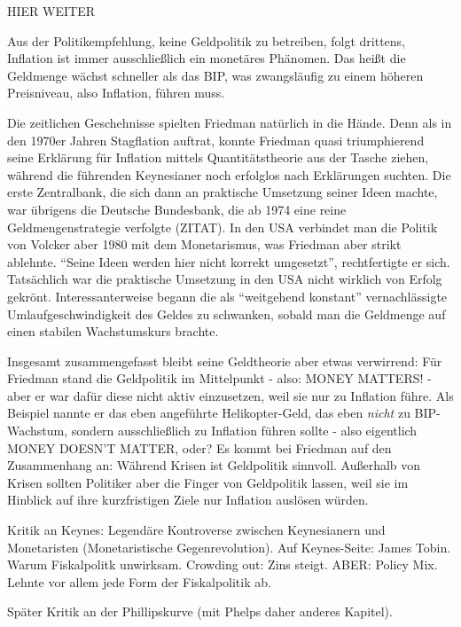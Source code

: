 HIER WEITER

Aus der Politikempfehlung, keine Geldpolitik zu betreiben, folgt drittens, Inflation ist immer ausschließlich ein monetäres Phänomen. Das heißt die Geldmenge wächst schneller als das BIP, was zwangsläufig zu einem höheren Preisniveau, also Inflation, führen muss.

Die zeitlichen Geschehnisse spielten Friedman natürlich in die Hände. Denn als in den 1970er Jahren Stagflation auftrat, konnte Friedman quasi triumphierend seine Erklärung für Inflation mittels Quantitätstheorie aus der Tasche ziehen, während die führenden Keynesianer noch erfolglos nach Erklärungen suchten. Die erste Zentralbank, die sich dann an praktische Umsetzung seiner Ideen machte, war übrigens die Deutsche Bundesbank, die ab 1974 eine reine Geldmengenstrategie verfolgte (ZITAT). In den USA verbindet man die Politik von Volcker aber 1980 mit dem Monetarismus, was Friedman aber strikt ablehnte. "`Seine Ideen werden hier nicht korrekt umgesetzt"', rechtfertigte er sich. Tatsächlich war die praktische Umsetzung in den USA nicht wirklich von Erfolg gekrönt. Interessanterweise begann die als "`weitgehend konstant"' vernachlässigte Umlaufgeschwindigkeit des Geldes zu schwanken, sobald man die Geldmenge auf einen stabilen Wachstumskurs brachte.



Insgesamt zusammengefasst bleibt seine Geldtheorie aber etwas verwirrend: Für Friedman stand die Geldpolitik im Mittelpunkt - also: MONEY MATTERS! - aber er war dafür diese nicht aktiv einzusetzen, weil sie nur zu Inflation führe. Als Beispiel nannte er das eben angeführte Helikopter-Geld, das eben \textit{nicht} zu BIP-Wachstum, sondern ausschließlich zu Inflation führen sollte - also eigentlich MONEY DOESN'T MATTER, oder? Es kommt bei Friedman auf den Zusammenhang an: Während Krisen ist Geldpolitik sinnvoll. Außerhalb von Krisen sollten Politiker aber die Finger von Geldpolitik lassen, weil sie im Hinblick auf ihre kurzfristigen Ziele nur Inflation auslösen würden.



Kritik an Keynes: Legendäre Kontroverse zwischen Keynesianern und Monetaristen (Monetaristische Gegenrevolution). Auf Keynes-Seite: James Tobin. Warum Fiskalpolitk unwirksam. Crowding out: Zins steigt. ABER: Policy Mix. Lehnte vor allem jede Form der Fiskalpolitik ab.



Später Kritik an der Phillipskurve (mit Phelps daher anderes Kapitel).


